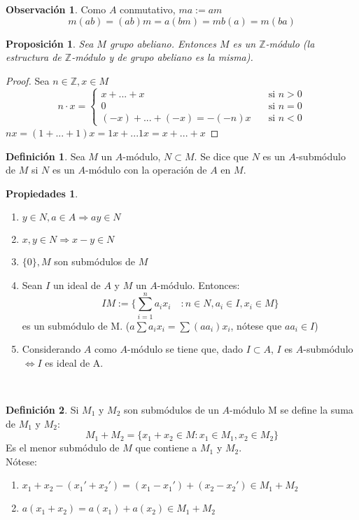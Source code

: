 \documentclass{article}
\theoremstyle{theorem-style}  %
\newtheorem{proposition}[theorem]{Proposición}
\theoremstyle{definition}
\newtheorem{definition}{Definición}[section]
\newtheorem*{observation}{Observación} %
\newtheorem*{properties}{Propiedades}
\theoremstyle{example-style}
\begin{document}
	\begin{observation}
		Como $A$ conmutativo, $ma:=am$
		\[m(ab)=(ab)m=a(bm)=mb(a)=m(ba)\]
	\end{observation}
	\begin{proposition}
		Sea $M$ grupo abeliano.
		Entonces $M$ es un $\mathbb{Z}$-módulo (la estructura de $\mathbb{Z}$-módulo y de grupo abeliano es la misma).
	\end{proposition}
	\begin{proof}
		Sea $n \in \mathbb{Z}, x\in M$
		\[n\cdot x= \begin{cases}
			x+...+x&\quad \text{si }n>0\\
			0 &\quad \text{si } n=0\\
			(-x)+...+(-x)=-(-n)x &\quad \text{si }n<0
		\end{cases}
		 \]
		$nx=(1+...+1)x=1x+...1x=x+...+x$
	\end{proof}


	\begin{definition}
		Sea $M$ un $A$-módulo, $N\subset M$.
		Se dice que $N$ es un $A$-submódulo de $M$ si $N$ es un $A$-módulo con la operación de $A$ en $M$.
	\end{definition}

	\begin{properties}
		\ 
		\begin{enumerate}
			\item $ y \in N, a \in A \Rightarrow  ay\in N$
			\item $ x,y\in N  \Rightarrow x-y \in N$
			\item $\{0\}, M$ son submódulos de $M$
			\item Sean $I$ un ideal de $A$ y $M$ un $A$-módulo. Entonces:
			\[IM:=\{ \sum_{i=1}^{n} a_ix_i \quad : n \in N, a_i \in I, x_i \in M\}\]
			es un submódulo de M. ($a  \sum a_i x_i = \sum (a a_i)  x_i$, nótese que $aa_i\in I$)

			\item Considerando $A$ como $A$-módulo se tiene que, dado $I\subset A$, $I$ es $A$-submódulo $\Leftrightarrow I$ es ideal de A.
		\end{enumerate}
	\end{properties}
	\

	\begin{definition}
		Si $ M_1 $ y $ M_2 $ son submódulos de un $ A $-módulo M se define la suma de $M_1 $ y $ M_2$:
				\[ M_1+M_2 = \{x_1+x_2 \in M : x_1\in M_1, x_2 \in M_2\}\]
		Es el menor submódulo de $ M $ que contiene a $ M_1 $ y $ M_2 $.\\
		Nótese:
		\begin{enumerate}
			\item $ x_1+x_2-(x_1'+x_2') = (x_1-x_1')+ (x_2-x_2') \in M_1+M_2 $
			\item $ a(x_1+x_2)=a(x_1)+a(x_2)\in M_1+M_2 $
		\end{enumerate}
	\end{definition}
	\ 
\end{document}
